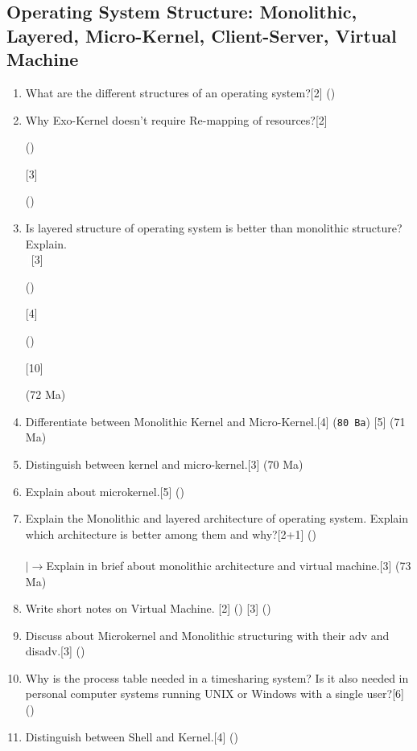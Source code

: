 \documentclass[12pt]{article}
\newcommand{\lb}{\\$\left|\rightarrow\right.$}
\newcommand{\enter}{\\\textcolor{white}{1}}
\begin{document}
	\subsection{Operating System Structure: Monolithic, Layered, Micro-Kernel, Client-Server, Virtual Machine}
	\begin{enumerate}
	\item What are the different structures of an operating system?\hfill[2] ()
	\item Why Exo-Kernel doesn't require Re-mapping of resources?\hfill[2] \begin{small}()\end{small} [3] \begin{small}()\end{small}
	\item Is layered structure of operating system is better than monolithic structure? Explain.
	\enter \hfill[3] \begin{small}()\end{small} [4] \begin{small}()\end{small} [10] \begin{small}(72 Ma)\end{small}
	\item Differentiate between Monolithic Kernel and Micro-Kernel.\hfill[4] (\texttt{80 Ba}) [5] (71 Ma)
	\item Distinguish between kernel and micro-kernel.\hfill[3] (70 Ma)
	\item Explain about microkernel.\hfill[5] ()
	\item Explain the Monolithic and layered architecture of operating system. Explain which architecture is better among them and why?\hspace{6.7cm}[2+1] ()\\
	\lb Explain in brief about monolithic architecture and virtual machine.\hfill[3] (73 Ma)

	\item Write short notes on Virtual Machine. \hfill [2] () [3] ()

	\item Discuss about Microkernel and Monolithic structuring with their adv and disadv.[3] () 
	\item Why is the process table needed in a timesharing system? Is it also needed in personal computer systems running UNIX or Windows with a single user?\hfill[6] ()
	\item Distinguish between Shell and Kernel.\hfill[4] ()
	\end{enumerate}
\end{document}
